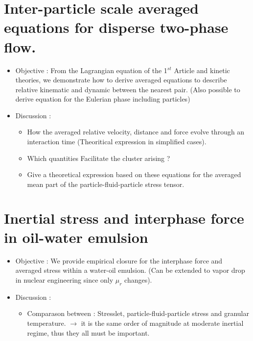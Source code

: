 \documentclass[12pt]{book}
\begin{document}
\section{Inter-particle scale averaged equations for disperse two-phase flow.}
\begin{itemize}
    \item Objective : From the Lagrangian equation of the 1$^{st}$ Article and kinetic theories, we demonstrate how to derive averaged equations to describe relative kinematic and dynamic between the nearest pair.  
    (Also possible to derive equation for the Eulerian  phase including particles)
    \item Discussion : 
    \begin{itemize}
        \item How the averaged relative velocity, distance and force evolve through an interaction time (Theoritical expression in simplified cases). 
        \item Which quantities Facilitate the cluster arising ? 
        \item Give a theoretical expression based on these equations for the averaged mean part of the particle-fluid-particle stress tensor. 
    \end{itemize}
\end{itemize}
\section{Inertial stress and interphase force in oil-water emulsion}
\begin{itemize}
    \item Objective : We provide empirical closure for the interphase force and averaged stress within a water-oil emulsion. 
    (Can be extended to vapor drop in nuclear engineering since only $\mu_r$ changes). 
    \item Discussion : 
    \begin{itemize}
        \item Comparason between : Stresslet, particle-fluid-particle stress and granular temperature. $\rightarrow$ it is the same order of magnitude at moderate inertial regime, thus they all must be important. 
    \end{itemize}
\end{itemize}
\end{document}
